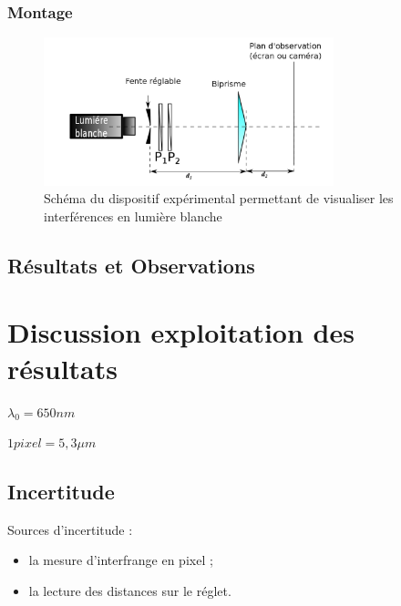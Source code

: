 \documentclass[11pt, a4paper]{article}
\begin{document}
    \subsubsection{Montage}
    \begin{figure}[htbp] %
        \centering %
        \includegraphics[width=0.75\textwidth]{schema3} %
        \caption{Schéma du dispositif expérimental permettant de visualiser les interférences en lumière blanche} %
        \label{schema3}%
    \end{figure}
    \subsection{Résultats et Observations}



\section{Discussion exploitation des résultats}


$\lambda_{0}=650nm$ 

$1 pixel=5,3 \mu m$
    \subsection{Incertitude}
    Sources d'incertitude :
    \begin{itemize}
        \item la mesure d'interfrange en pixel ;
        \item la lecture des distances sur le réglet.
        \end{itemize}
\end{document}
